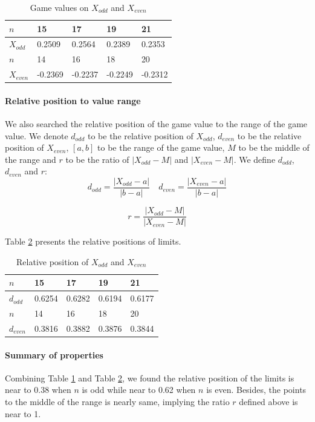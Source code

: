 \documentclass[a4paper,english]{article}
\begin{document}
\begin{spacing}{1.4}
\begin{table} \label{Game-value-table}
\centering
\begin{tabular}{lllll}
\hline
 $n$ & 15 & 17 & 19 & 21 \\
 \hline
 $X_{odd}$ & 0.2509 & 0.2564 & 0.2389 & 0.2353 \\
 \hline
 $n$ & 14 & 16 & 18 & 20 \\
 \hline
 $X_{even}$ & -0.2369 &  -0.2237 & -0.2249 & -0.2312 \\
 \hline
\end{tabular}
\caption{Game values on $X_{odd}$ and $X_{even}$}
\end{table}
\paragraph{Relative position to value range}
We also searched the relative position of the game value to the range of the game value. We denote $d_{odd}$ to be the relative position of $X_{odd}$, $d_{even}$ to be the relative position of $X_{even}$, $[a,b]$ to be the range of the game value, $M$ to be the middle of the range and $r$ to be the ratio of $|X_{odd}-M|$ and $|X_{even}-M|$. We define $d_{odd}$, $d_{even}$ and $r$:
\begin{equation*}
    d_{odd}=\frac{|X_{odd}-a|}{|b-a|} \quad d_{even}=\frac{|X_{even}-a|}{|b-a|}
\end{equation*}

\begin{equation*}
    r = \frac{|X_{odd}-M|}{|X_{even}-M|}
\end{equation*}

Table \ref{relative-position} presents the relative positions of limits.

\begin{table} \label{relative-position}
\centering
\begin{tabular}{lllll}
\hline
 $n$ & 15 & 17 & 19 & 21 \\
 \hline
 $d_{odd}$ & 0.6254 & 0.6282 & 0.6194 & 0.6177 \\
 \hline
 $n$ & 14 & 16 & 18 & 20 \\
 \hline
 $d_{even}$ & 0.3816 &  0.3882 & 0.3876 & 0.3844 \\
 \hline
\end{tabular}
\caption{Relative position of $X_{odd}$ and $X_{even}$}
\end{table}

\paragraph{Summary of properties}
Combining Table \ref{Game-value-table} and Table \ref{relative-position}, we found the relative position of the limits is near to 0.38 when $n$ is odd while near to 0.62 when $n$ is even. Besides, the points to the middle of the range is nearly same, implying the ratio $r$ defined above is near to 1.


\end{spacing}
\end{document}
